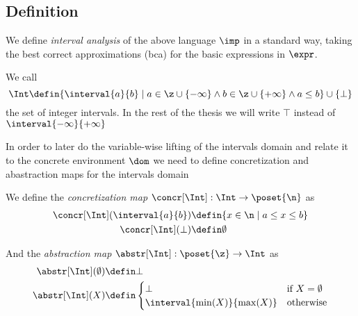\subsection{Definition}
\label{sub:intervals}

We define \emph{interval analysis} of the above language \(\imp\) in a
standard way, taking the best correct approximations (bca) for the
basic expressions in \(\expr\).

\begin{definition}
  We call
  \begin{equation*}
    \Int \defin \{ \interval{a}{b} \mid a \in \z \cup \{-\infty\}
    \wedge b \in \z \cup \{+\infty\} \wedge a\leq b \} \cup
    \{\bot\} 
  \end{equation*}
  the set of integer intervals. In the rest of the thesis we will
  write \(\top\) instead of \(\interval{-\infty}{+\infty}\)
\end{definition}

In order to later do the variable-wise lifting of the intervals domain
and relate it to the concrete environment \(\dom\) we need to define
concretization and abastraction maps for the intervals domain

\begin{definition}
  We define the \emph{concretization map} \(\concr[\Int] : \Int \to
  \poset{\n}\) as
  \begin{align*}
    \concr[\Int](\interval{a}{b}) & \defin \{x\in \n \mid a \leq x \leq b\} \\
    \concr[\Int](\bot) & \defin \emptyset
  \end{align*}

  And the \emph{abstraction map} \(\abstr[\Int]:\poset{\z} \to \Int\) as
  \begin{align*}
    \abstr[\Int](\emptyset) & \defin \bot \\
    \abstr[\Int](X) & \defin
    \begin{cases}
      \bot & \text{if } X = \emptyset \\
      \interval{\min(X)}{\max(X)} & \text{otherwise}
    \end{cases}
  \end{align*}
\end{definition}

